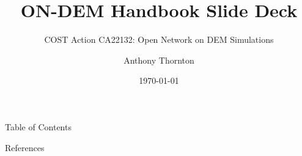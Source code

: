 \documentclass[11pt, aspectratio=169]{beamer}
\title[ON-DEM Handbook]{ON-DEM Handbook Slide Deck}
\subtitle{COST Action CA22132: Open Network on DEM Simulations}
\author[A. Thornton]{Anthony Thornton}
\institute[ON-DEM]{Open Network on Discrete Element Method Simulations}
\date{\today}
\begin{document}
\begin{frame}
    \titlepage
\end{frame}

\begin{frame}{Table of Contents}
    \tableofcontents[hideallsubsections]
\end{frame}




\begin{frame}[allowframebreaks]{References}
     
     
\end{frame}
\end{document}
